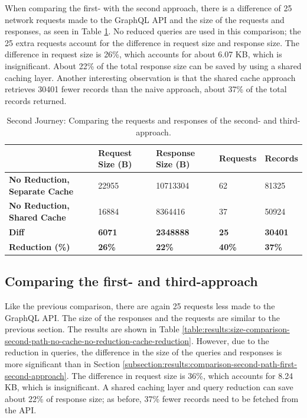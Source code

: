 When comparing the first- with the second approach, there is a difference of 25 network requests made to the GraphQL \ac{API} and the size of the requests and responses, as seen in Table \ref{table:results:size-comparison-second-path-cache-no-reduction-cache-reduction}. No reduced queries are used in this comparison; the 25 extra requests account for the difference in request size and response size. The difference in request size is 26\%, which accounts for about 6.07 KB, which is insignificant. About 22\% of the total response size can be saved by using a shared caching layer. Another interesting observation is that the shared cache approach retrieves 30401 fewer records than the naive approach, about 37\% of the total records returned.

\ifshowTables
\begin{table}[H]
  \begin{tabular}{|l|l|l|l|l|}
  \hline
  & \textbf{Request Size (B)} & \textbf{Response Size (B)} & \textbf{Requests} & \textbf{Records} \\
  \hline
  \textbf{No Reduction, Separate Cache} & 22955 & 10713304 & 62 & 81325 \\
  \hline
  \textbf{No Reduction, Shared Cache} & 16884 & 8364416 & 37 & 50924 \\
  \hline
  \hline
  \textbf{Diff} & \textbf{6071} & \textbf{2348888} & \textbf{25} & \textbf{30401} \\
  \hline
  \textbf{Reduction (\%)} & \textbf{26\%} & \textbf{22\%} & \textbf{40\%} & \textbf{37\%} \\
  \hline
  \end{tabular}
  \caption{Second Journey: Comparing the requests and responses of the second- and third-approach.}\label{table:results:size-comparison-second-path-cache-no-reduction-cache-reduction}
\end{table}
\fi

\subsection{Comparing the first- and third-approach}\label{subsection:results:comparison-second-path-second-third-approach}

Like the previous comparison, there are again 25 requests less made to the GraphQL \ac{API}. The size of the responses and the requests are similar to the previous section. The results are shown in Table \ref{table:results:size-comparison-second-path-no-cache-no-reduction-cache-reduction}. However, due to the reduction in queries, the difference in the size of the queries and responses is more significant than in Section \ref{subsection:results:comparison-second-path-first-second-approach}. The difference in request size is 36\%, which accounts for 8.24 KB,
which is insignificant. A shared caching layer and query reduction can save about 22\% of response size; as before, 37\% fewer records need to be fetched from the \ac{API}.

